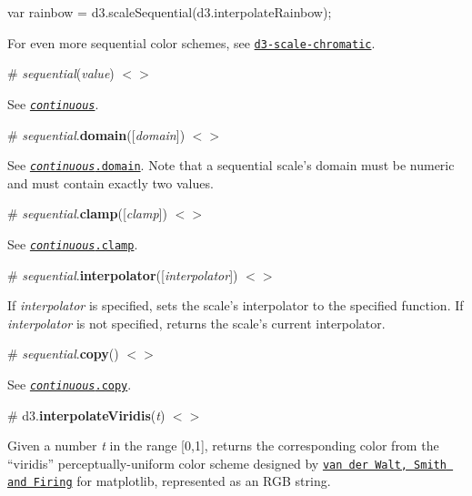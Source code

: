 \begin{DoxyCode}
var rainbow = d3.scaleSequential(d3.interpolateRainbow);
\end{DoxyCode}


For even more sequential color schemes, see \href{https://github.com/d3/d3-scale-chromatic}{\tt d3-\/scale-\/chromatic}.

\label{__sequential}%
\# {\itshape sequential}({\itshape value}) \href{https://github.com/d3/d3-scale/blob/master/src/sequential.js#L3}{\tt $<$$>$}

See \href{#_continuous}{\tt {\itshape continuous}}.

\label{_sequential_domain}%
\# {\itshape sequential}.{\bfseries domain}(\mbox{[}{\itshape domain}\mbox{]}) \href{https://github.com/d3/d3-scale/blob/master/src/sequential.js#L13}{\tt $<$$>$}

See \href{#continuous_domain}{\tt {\itshape continuous}.domain}. Note that a sequential scale’s domain must be numeric and must contain exactly two values.

\label{_sequential_clamp}%
\# {\itshape sequential}.{\bfseries clamp}(\mbox{[}{\itshape clamp}\mbox{]}) \href{https://github.com/d3/d3-scale/blob/master/src/sequential.js#L17}{\tt $<$$>$}

See \href{#continuous_clamp}{\tt {\itshape continuous}.clamp}.

\label{_sequential_interpolator}%
\# {\itshape sequential}.{\bfseries interpolator}(\mbox{[}{\itshape interpolator}\mbox{]}) \href{https://github.com/d3/d3-scale/blob/master/src/sequential.js#L21}{\tt $<$$>$}

If {\itshape interpolator} is specified, sets the scale’s interpolator to the specified function. If {\itshape interpolator} is not specified, returns the scale’s current interpolator.

\label{_sequential_copy}%
\# {\itshape sequential}.{\bfseries copy}() \href{https://github.com/d3/d3-scale/blob/master/src/sequential.js#L25}{\tt $<$$>$}

See \href{#continuous_copy}{\tt {\itshape continuous}.copy}.

\label{_interpolateViridis}%
\# d3.{\bfseries interpolate\+Viridis}({\itshape t}) \href{https://github.com/d3/d3-scale/blob/master/src/viridis.js}{\tt $<$$>$}



Given a number {\itshape t} in the range \mbox{[}0,1\mbox{]}, returns the corresponding color from the “viridis” perceptually-\/uniform color scheme designed by \href{https://bids.github.io/colormap/}{\tt van der Walt, Smith and Firing} for matplotlib, represented as an R\+GB string.

